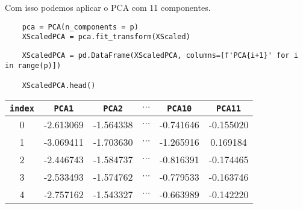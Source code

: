 Com isso podemos aplicar o PCA com 11 componentes.
\begin{longlisting}
    \begin{verbatim}
    pca = PCA(n_components = p)
    XScaledPCA = pca.fit_transform(XScaled)
    \end{verbatim}
\end{longlisting}
\begin{longlisting}
    \begin{verbatim}
    XScaledPCA = pd.DataFrame(XScaledPCA, columns=[f'PCA{i+1}' for i in range(p)])

    XScaledPCA.head()
    \end{verbatim}
\end{longlisting}
\begin{table}[H]
    \centering
    \begin{tabular}{cccccc}
        \toprule
        \verb|index| & \verb|PCA1| & \verb|PCA2| & $\cdots$ & \verb|PCA10| & \verb|PCA11|  \\ 
        \midrule
        0 & -2.613069 & -1.564338 & $\cdots$ & -0.741646 & -0.155020 \\
        1 & -3.069411 & -1.703630 & $\cdots$ & -1.265916 & 0.169184 \\
        2 & -2.446743 & -1.584737 & $\cdots$ & -0.816391 & -0.174465 \\
        3 & -2.533493 & -1.574762 & $\cdots$ & -0.779533 & -0.163746 \\
        4 & -2.757162 & -1.543327 & $\cdots$ & -0.663989 & -0.142220 \\
        \bottomrule
    \end{tabular}
\end{table}

